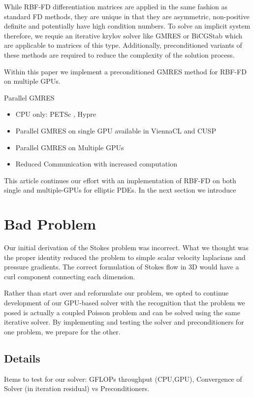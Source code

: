 While RBF-FD differentiation matrices are applied in the same fashion as standard FD methods, they are unique in that they are asymmetric, non-positive definite and potentially have high condition numbers. To solve an implicit system therefore, we requie an iterative krylov solver like GMRES or BiCGStab which are applicable to matrices of this type. Additionally, preconditioned variants of these methods are required to reduce the complexity of the solution process. 

Within this paper we implement a preconditioned GMRES method for RBF-FD on multiple GPUs. 

Parallel GMRES
\begin{itemize} 
	\item CPU only: PETSc \cite{Yokota2010}, Hypre \cite{Wildemann2009} 
	\item Parallel GMRES on single GPU available in ViennaCL \cite{Rupp2010} and CUSP \cite{Cusp2010}
	\item Parallel GMRES on Multiple GPUs \cite{Bahi2011}
	\item Reduced Communication with increased computation \cite{Dekker2000}
\end{itemize} 

This article continues our effort with an implementation of RBF-FD on both single and multiple-GPUs for elliptic PDEs. In the next section we introduce 

\section{Bad Problem} 

Our initial derivation of the Stokes problem was incorrect. What we thought was
the proper identity reduced the problem to simple scalar velocity laplacians and
pressure gradients. The correct formulation of Stokes flow in 3D would have a
curl component connecting each dimension. 

Rather than start over and reformulate our problem, we opted to continue
development of our GPU-based solver with the recognition that the problem we
posed is actually a coupled Poisson problem and can be solved using the same
iterative solver. By implementing and testing the solver and preconditioners for
one problem, we prepare for the other.  

\subsection{Details}
Items to test for our solver: GFLOPs throughput (CPU,GPU), Convergence of Solver (in
iteration residual) vs Preconditioners.

